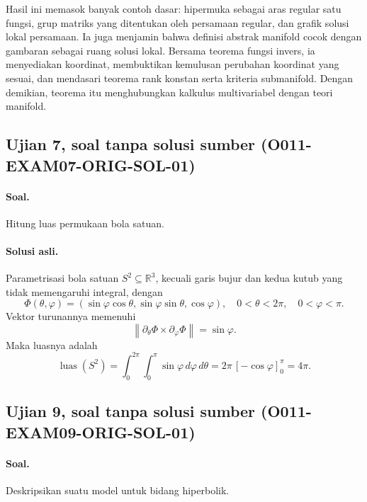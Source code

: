 Hasil ini memasok banyak contoh dasar: hipermuka sebagai aras regular satu
fungsi, grup matriks yang ditentukan oleh persamaan regular, dan grafik solusi
lokal persamaan. Ia juga menjamin bahwa definisi abstrak manifold cocok dengan
gambaran sebagai ruang solusi lokal. Bersama teorema fungsi invers, ia
menyediakan koordinat, membuktikan kemulusan perubahan koordinat yang sesuai,
dan mendasari teorema rank konstan serta kriteria submanifold. Dengan demikian,
teorema itu menghubungkan kalkulus multivariabel dengan teori manifold.

\subsection*{Ujian 7, soal tanpa solusi sumber (O011-EXAM07-ORIG-SOL-01)}
\label{o011-exam07-orig-sol-01}

\paragraph{Soal.}
Hitung luas permukaan bola satuan.

\paragraph{Solusi asli.}
Parametrisasi bola satuan $S^2\subseteq\mathbb R^3$, kecuali garis bujur dan
kedua kutub yang tidak memengaruhi integral, dengan
\[
 \Phi(\theta,\varphi)
 =(\sin\varphi\cos\theta,\sin\varphi\sin\theta,\cos\varphi),
 \quad 0<\theta<2\pi,\quad0<\varphi<\pi.
\]
Vektor turunannya memenuhi
\[
 \left\|\partial_\theta\Phi\times\partial_\varphi\Phi\right\|
 =\sin\varphi.
\]
Maka luasnya adalah
\[
 \operatorname{luas}(S^2)
 =\int_0^{2\pi}\int_0^\pi\sin\varphi\,d\varphi\,d\theta
 =2\pi\,[ -\cos\varphi ]_0^\pi
 =4\pi.
\]

\subsection*{Ujian 9, soal tanpa solusi sumber (O011-EXAM09-ORIG-SOL-01)}
\label{o011-exam09-orig-sol-01}

\paragraph{Soal.}
Deskripsikan suatu model untuk bidang hiperbolik.

